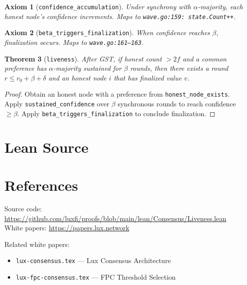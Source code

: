 \documentclass[11pt]{article}
\newtheorem{theorem}{Theorem}
\newtheorem{axiom_stmt}[theorem]{Axiom}
\begin{document}
\begin{axiom_stmt}[\texttt{confidence\_accumulation}]
Under synchrony with $\alpha$-majority, each honest node's confidence increments. Maps to \texttt{wave.go:159: state.Count++}.
\end{axiom_stmt}

\begin{axiom_stmt}[\texttt{beta\_triggers\_finalization}]
When confidence reaches $\beta$, finalization occurs. Maps to \texttt{wave.go:161--163}.
\end{axiom_stmt}

\begin{theorem}[\texttt{liveness}]
After GST, if honest count $> 2f$ and a common preference has $\alpha$-majority sustained for $\beta$ rounds, then there exists a round $r \leq r_0 + \beta + \delta$ and an honest node $i$ that has finalized value $v$.
\end{theorem}
\begin{proof}
Obtain an honest node with a preference from \texttt{honest\_node\_exists}. Apply \texttt{sustained\_confidence} over $\beta$ synchronous rounds to reach confidence $\geq \beta$. Apply \texttt{beta\_triggers\_finalization} to conclude finalization.
\end{proof}


\section{Lean Source}


\section{References}
\noindent Source code: \url{https://github.com/luxfi/proofs/blob/main/lean/Consensus/Liveness.lean}\\
\noindent White papers: \url{https://papers.lux.network}

\noindent Related white papers:
\begin{itemize}
  \item \texttt{lux-consensus.tex} --- Lux Consensus Architecture
  \item \texttt{lux-fpc-consensus.tex} --- FPC Threshold Selection
\end{itemize}
\end{document}
